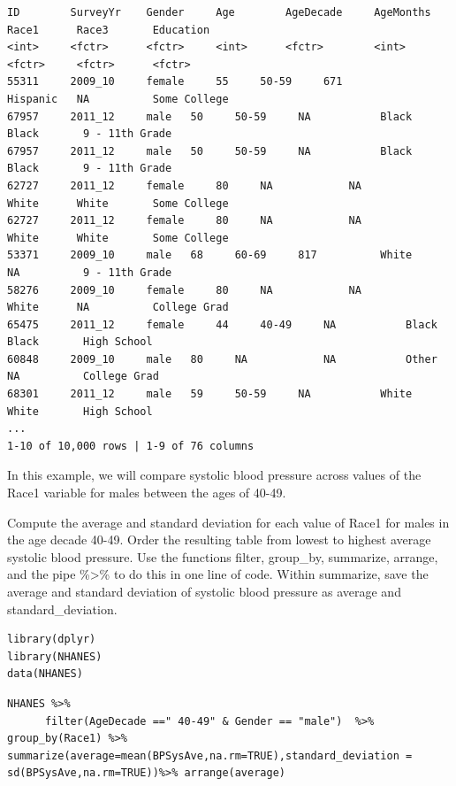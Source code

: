 \documentclass[
]{article}
\begin{document}
\begin{verbatim}
ID        SurveyYr    Gender     Age        AgeDecade     AgeMonths    Race1      Race3       Education
<int>     <fctr>      <fctr>     <int>      <fctr>        <int>        <fctr>     <fctr>      <fctr>
55311     2009_10     female     55     50-59     671          Hispanic   NA          Some College  
67957     2011_12     male   50     50-59     NA           Black      Black       9 - 11th Grade    
67957     2011_12     male   50     50-59     NA           Black      Black       9 - 11th Grade    
62727     2011_12     female     80     NA            NA           White      White       Some College  
62727     2011_12     female     80     NA            NA           White      White       Some College  
53371     2009_10     male   68     60-69     817          White      NA          9 - 11th Grade    
58276     2009_10     female     80     NA            NA           White      NA          College Grad  
65475     2011_12     female     44     40-49     NA           Black      Black       High School   
60848     2009_10     male   80     NA            NA           Other      NA          College Grad  
68301     2011_12     male   59     50-59     NA           White      White       High School   
...
1-10 of 10,000 rows | 1-9 of 76 columns
\end{verbatim}

In this example, we will compare systolic blood pressure across values
of the Race1 variable for males between the ages of 40-49.

Compute the average and standard deviation for each value of Race1 for
males in the age decade 40-49. Order the resulting table from lowest to
highest average systolic blood pressure. Use the functions filter,
group\_by, summarize, arrange, and the pipe \%\textgreater\% to do this
in one line of code. Within summarize, save the average and standard
deviation of systolic blood pressure as average and standard\_deviation.

\begin{verbatim}
library(dplyr)
library(NHANES)
data(NHANES)
\end{verbatim}

\begin{verbatim}
NHANES %>%
      filter(AgeDecade ==" 40-49" & Gender == "male")  %>% group_by(Race1) %>% summarize(average=mean(BPSysAve,na.rm=TRUE),standard_deviation = sd(BPSysAve,na.rm=TRUE))%>% arrange(average)
\end{verbatim}
\end{document}
